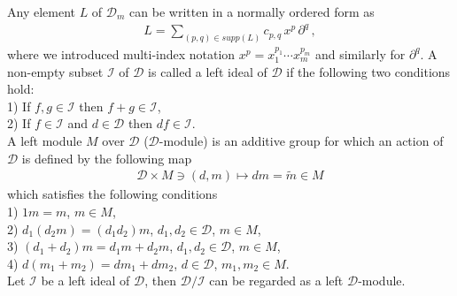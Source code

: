 \documentclass[11pt]{article}
\begin{document}
Any element $L$ of $\mathcal{D}_{m}$ can be written in a normally ordered form as
\begin{align}
  L = \sum_{(p,q) \in supp(L)} 
  c_{p,q} \, x^{p} \, \partial^{q}\,,     
  \label{eq:normally_ordered_form}
\end{align}
where we introduced multi-index notation $x^{p} = x_{1}^{p_{1}}\cdots x_{m}^{p_{m}}$ and similarly for $\partial^{q}$.
A non-empty subset $\mathcal{I}$ of $\mathcal{D}$ is called a left ideal of $\mathcal{D}$ if the following two conditions hold: \\
1) If $f,g \in \mathcal{I}$ then $f+g \in \mathcal{I}$,\\
2) If $f \in \mathcal{I}$ and $d \in \mathcal{D}$ then $df \in \mathcal{I}$. \\
A left module $M$ over $\mathcal{D}$ ($\mathcal{D}$-module) is an additive group for which an action of $\mathcal{D}$ is defined by the following map
\begin{align}
\mathcal{D} \times M \ni (d,m) \mapsto dm=\tilde{m} \in M    
\end{align}
which satisfies the following conditions \\
1) $1m = m$, $m\in M$, \\ 
2) $d_{1}(d_{2}m) = (d_{1}d_{2})m$, $d_{1},d_{2}\in \mathcal{D}$, $m \in M$, \\
3) $(d_{1}+d_{2})m = d_{1}m + d_{2}m$, $d_{1},d_{2} \in \mathcal{D}$, $m \in M$, \\
4) $d(m_{1}+m_{2})=dm_{1} + dm_{2}$, $d\in \mathcal{D}$, $m_{1},m_{2}\in M$. \\
Let $\mathcal{I}$ be a left ideal of $\mathcal{D}$, then $\mathcal{D}/\mathcal{I}$ can be regarded as a left $\mathcal{D}$-module. 
\end{document}
